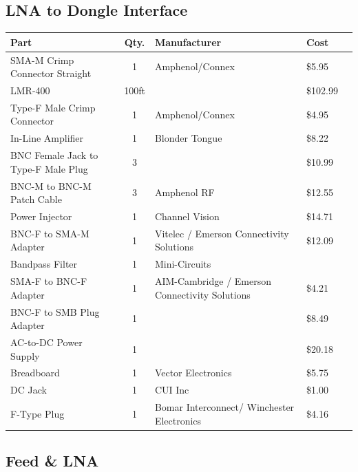 \documentclass[11pt]{article} %
\begin{document}
\subsection{LNA to Dongle Interface}

\begin{tabular}{| p{6cm} | c | p{5cm} | l | c |}
\hline
\textbf{Part} & \textbf{Qty.} & \textbf{Manufacturer} & \textbf{Cost} \\ \hline \hline
SMA-M Crimp Connector Straight & 1 & Amphenol/Connex & \$5.95 \\ \hline
LMR-400 & 100ft & & \$102.99\\ \hline
Type-F Male Crimp Connector & 1 & Amphenol/Connex &\$4.95 \\ \hline
In-Line Amplifier & 1 & Blonder Tongue & \$8.22 \\ \hline
BNC Female Jack to Type-F Male Plug & 3 & & \$10.99 \\ \hline
BNC-M to BNC-M Patch Cable & 3 & Amphenol RF & \$12.55 \\ \hline
Power Injector & 1 & Channel Vision & \$14.71 \\ \hline
BNC-F to SMA-M Adapter & 1 & Vitelec / Emerson Connectivity Solutions & \$12.09 \\ \hline
Bandpass Filter & 1 & Mini-Circuits & \\ \hline
SMA-F to BNC-F Adapter & 1 & AIM-Cambridge / Emerson Connectivity Solutions & \$4.21 \\ \hline
BNC-F to SMB Plug Adapter & 1 & & \$8.49 \\ \hline
AC-to-DC Power Supply & 1 & & \$20.18 \\ \hline
Breadboard & 1 & Vector Electronics & \$5.75 \\ \hline
DC Jack & 1 & CUI Inc & \$1.00 \\ \hline
F-Type Plug & 1 & Bomar Interconnect/ Winchester Electronics & \$4.16\\ \hline
\end{tabular}

\subsection{Feed \& LNA}
\end{document}

